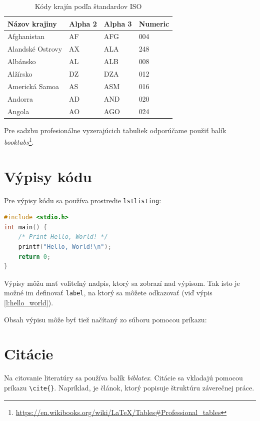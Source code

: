 \begin{table}[!ht]
	\caption{Kódy krajín podľa štandardov ISO}\label{t:1}
	\smallskip
	\centering

	\begin{tabular}{llll}
		\toprule
		Názov krajiny & Alpha 2 & Alpha 3 & Numeric\\
		\midrule
		Afghanistan & AF & AFG & 004\\
		Alandské Ostrovy & AX & ALA & 248\\
		Albánsko & AL & ALB & 008\\
		Alžírsko & DZ & DZA & 012\\
		Americká Samoa & AS & ASM & 016\\
		Andorra & AD & AND & 020\\
		Angola & AO & AGO & 024\\
		\toprule
	\end{tabular}
\end{table}

Pre sadzbu profesionálne vyzerajúcich tabuliek odporúčame použiť balík \emph{booktabs}\footnote{\url{https://en.wikibooks.org/wiki/LaTeX/Tables\#Professional_tables}}.


\section{Výpisy kódu}

Pre výpisy kódu sa používa prostredie \texttt{lstlisting}:

\begin{lstlisting}[language=C,caption={Program, ktorý pozdraví celý svet}, label={l:hello_world}]
#include <stdio.h>
int main() {
    /* Print Hello, World! */
    printf("Hello, World!\n");
    return 0;
}
\end{lstlisting}

Výpisy môžu mať voliteľný nadpis, ktorý sa zobrazí nad výpisom. Tak isto je možné im definovať \texttt{label}, na ktorý sa môžete odkazovať (viď výpis \ref{l:hello_world}).

Obsah výpisu môže byť tiež načítaný zo súboru pomocou príkazu:




\section{Citácie}

Na citovanie literatúry sa používa balík \emph{biblatex}. Citácie sa vkladajú pomocou príkazu \verb|\cite{}|. Napríklad, \cite{Beel2010} je článok, ktorý popisuje štruktúru záverečnej práce.

